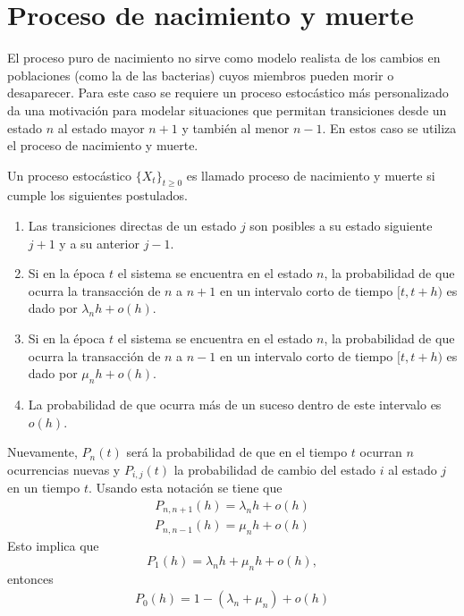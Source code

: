 \section{Proceso de nacimiento y muerte}
\label{section_procesoNacMu}
El proceso puro de nacimiento no sirve como modelo realista de los cambios en poblaciones (como la de las bacterias) cuyos miembros pueden morir o desaparecer. Para este caso se requiere un proceso estocástico más personalizado da una motivación para modelar situaciones que permitan transiciones desde un estado $n$ al estado mayor $n+1$ y también al menor $n-1$. En estos caso se utiliza el proceso de nacimiento y muerte.\\
\begin{Def}
Un proceso estocástico $\{X_t\}_{t\geq 0}$ es  llamado proceso de nacimiento y muerte si cumple los siguientes postulados. 
    \begin{enumerate}
        \item Las transiciones directas de un estado $j$ son posibles a su estado siguiente $j+1$ y a su anterior $j-1$.
        \item Si en la época $t$ el sistema se encuentra en el estado $n$, la probabilidad de que ocurra la transacción de $n$ a $n+1$ en un intervalo corto de tiempo $[t,t+h)$ es dado por $\lambda_n h+o(h)$.

        \item Si en la época $t$ el sistema se encuentra en el estado $n$, la probabilidad de que ocurra la transacción de $n$ a $n-1$ en un intervalo corto de tiempo $[t,t+h)$ es dado por $\mu_n h+o(h)$.
        \item La probabilidad de que ocurra más de un suceso dentro de este intervalo es $o(h)$.
    \end{enumerate}
\end{Def}
Nuevamente, $P_n(t)$ será la probabilidad de que en el tiempo $t$ ocurran $n$ ocurrencias nuevas y $P_{i, j}(t)$ la probabilidad de cambio del estado $i$ al estado $j$ en un tiempo $t$. Usando esta notación se tiene que 
\begin{eqnarray}
     P_{n,n+1}(h)=\lambda_n h + o(h)
    \label{procNacimientoMuerte-condicion-1}
\end{eqnarray}
\begin{eqnarray}
    P_{n,n-1}(h)=\mu_n h + o(h)
    \label{procNacimientoMuerte-condicion-2}
\end{eqnarray}
Esto implica que
$$P_1(h)=\lambda_n h +\mu_n h+ o(h),$$
entonces
\begin{eqnarray}
    P_0(h)=1-(\lambda_n+\mu_n)+o(h)
    \label{procNacimientoMuerte-condicion-3}
\end{eqnarray}

